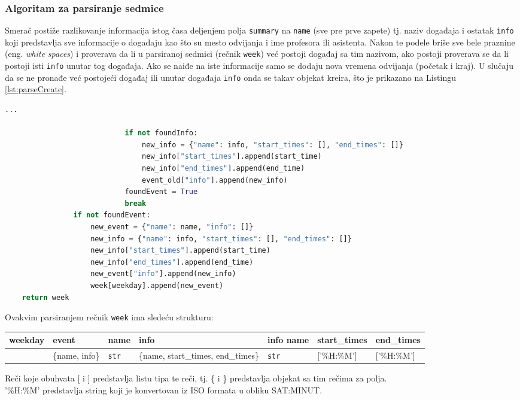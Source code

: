 \documentclass[a4paper,11pt]{article}
\begin{document}
\subsubsection{Algoritam za parsiranje sedmice}
Smerač postiže razlikovanje informacija istog časa deljenjem polja \texttt{summary} na \texttt{name} (sve pre prve zapete) tj. naziv događaja i ostatak \texttt{info} koji predstavlja sve informacije o događaju kao što su mesto odvijanja i ime profesora ili asistenta. Nakon te podele briše sve bele praznine (eng. \textit{white spaces}) i proverava da li u parsiranoj sedmici (rečnik \texttt{week}) već postoji događaj sa tim nazivom, ako postoji proverava se da li postoji isti \texttt{info} unutar tog događaja. Ako se naiđe na iste informacije samo se dodaju nova vremena odvijanja (početak i kraj). U slučaju da se ne pronađe već postojeći događaj ili unutar događaja \texttt{info} onda se takav objekat kreira, što je prikazano na Listingu \ref{lst:parseCreate}.
\begin{lstlisting}[language=Python, caption=Parsiranje sedmice, label=lst:parseCreate]
...

                            if not foundInfo:
                                new_info = {"name": info, "start_times": [], "end_times": []}
                                new_info["start_times"].append(start_time)
                                new_info["end_times"].append(end_time)
                                event_old["info"].append(new_info)
                            foundEvent = True
                            break
                if not foundEvent:
                    new_event = {"name": name, "info": []}
                    new_info = {"name": info, "start_times": [], "end_times": []}
                    new_info["start_times"].append(start_time)
                    new_info["end_times"].append(end_time)
                    new_event["info"].append(new_info)
                    week[weekday].append(new_event)
    return week
\end{lstlisting}
Ovakvim parsiranjem rečnik \texttt{week} ima sledeću strukturu:
\begin{center}
\begin{tabular}{|p{1.3cm}|p{1.4cm}|p{1.55cm}|p{2cm}|p{1.9cm}|p{2cm}|p{1.8cm}|}
    \hline
    weekday & event & name & info & info name & start\_times & end\_times \\
    \hline
    [event] & \{name, info\} & \texttt{str} & \{name, start\_times, end\_times\} & \texttt{str} & ['\%H:\%M'] & ['\%H:\%M'] \\
    \hline
\end{tabular}
\end{center}
Reči koje obuhvata [ i ] predstavlja listu tipa te reči, tj. \{ i \} predstavlja objekat sa tim rečima za polja.
\\
'\%H:\%M' predstavlja string koji je konvertovan iz ISO formata u obliku SAT:MINUT.
\newpage
\end{document}
